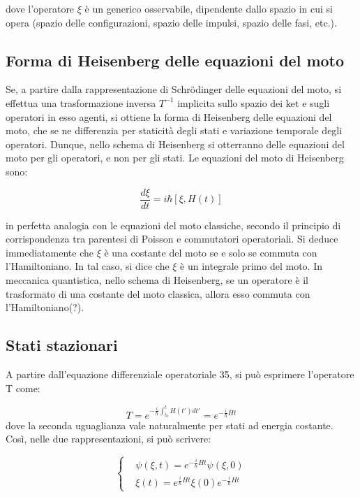 \documentclass{article}
\begin{document}
dove l'operatore $\xi$ è un generico osservabile, dipendente dallo spazio in cui si opera (spazio delle configurazioni, spazio delle impulsi, spazio delle fasi, etc.).

\subsection{Forma di Heisenberg delle equazioni del moto}
Se, a partire dalla rappresentazione di Schrödinger delle equazioni del moto, si effettua una trasformazione inversa $T^{-1}$ implicita sullo spazio dei ket
e sugli operatori in esso agenti, si ottiene la forma di Heisenberg delle equazioni del moto, che se ne differenzia per staticità degli stati e variazione temporale degli operatori.
Dunque, nello schema di Heisenberg si otterranno delle equazioni del moto per gli operatori, e non per gli stati.
Le equazioni del moto di Heisenberg sono:

\begin{equation}
   \frac{d\xi}{dt}=i\hbar[\xi,H(t)]
\end{equation}

in perfetta analogia con le equazioni del moto classiche, secondo il principio di corrispondenza tra parentesi di Poisson e commutatori operatoriali.
Si deduce immediatamente che $\xi$ è una costante del moto se e solo se commuta con l'Hamiltoniano. In tal caso, si dice che $\xi$ è un integrale primo del moto.
In meccanica quantistica, nello schema di Heisenberg, se un operatore è il trasformato di una costante del moto classica, allora esso commuta con l'Hamiltoniano(?).

\subsection{Stati stazionari}
A partire dall'equazione differenziale operatoriale 35, si può esprimere l'operatore T come:

\begin{equation}
    T=e^{-\frac{i}{\hbar}\int_{t_0}^{t}H(t')dt'}=e^{-\frac{i}{\hbar}Ht}
\end{equation}
dove la seconda uguaglianza vale naturalmente per stati ad energia costante.
Così, nelle due rappresentazioni, si può scrivere:

\begin{equation}
    \left\{
    \begin{aligned}
    & \psi(\xi,t)=e^{-\frac{i}{\hbar}Ht}\psi(\xi,0) \\
    & \xi(t)=e^{\frac{i}{\hbar}Ht}\xi(0)e^{-\frac{i}{\hbar}Ht}
    \end{aligned}
    \right.
\end{equation}
\end{document}

